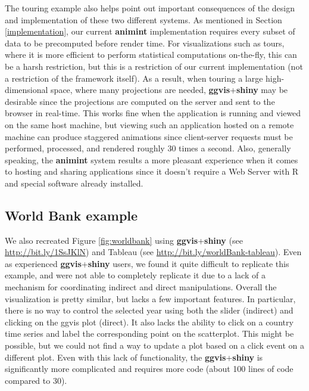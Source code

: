 \documentclass[12pt,]{article}
\theoremstyle{definition}
\theoremstyle{definition}
\theoremstyle{definition}
\theoremstyle{remark}
\begin{document}
The touring example also helps point out important consequences of the
design and implementation of these two different systems. As mentioned
in Section \ref{implementation}, our current \textbf{animint}
implementation requires every subset of data to be precomputed before
render time. For visualizations such as tours, where it is more
efficient to perform statistical computations on-the-fly, this can be a
harsh restriction, but this is a restriction of our current
implementation (not a restriction of the framework itself). As a result,
when touring a large high-dimensional space, where many projections are
needed, \textbf{ggvis}+\textbf{shiny} may be desirable since the
projections are computed on the server and sent to the browser in
real-time. This works fine when the application is running and viewed on
the same host machine, but viewing such an application hosted on a
remote machine can produce staggered animations since client-server
requests must be performed, processed, and rendered roughly 30 times a
second. Also, generally speaking, the \textbf{animint} system results a
more pleasant experience when it comes to hosting and sharing
applications since it doesn't require a Web Server with R and special
software already installed.

\hypertarget{world-bank-example}{%
\subsection{World Bank example}\label{world-bank-example}}

We also recreated Figure \ref{fig:worldbank} using
\textbf{ggvis}+\textbf{shiny} (see \url{http://bit.ly/1SsJKlN}) and
Tableau (see \url{http://bit.ly/worldBank-tableau}). Even as experienced
\textbf{ggvis}+\textbf{shiny} users, we found it quite difficult to
replicate this example, and were not able to completely replicate it due
to a lack of a mechanism for coordinating indirect and direct
manipulations. Overall the visualization is pretty similar, but lacks a
few important features. In particular, there is no way to control the
selected year using both the slider (indirect) and clicking on the ggvis
plot (direct). It also lacks the ability to click on a country time
series and label the corresponding point on the scatterplot. This might
be possible, but we could not find a way to update a plot based on a
click event on a different plot. Even with this lack of functionality,
the \textbf{ggvis}+\textbf{shiny} is significantly more complicated and
requires more code (about 100 lines of code compared to 30).
\end{document}
